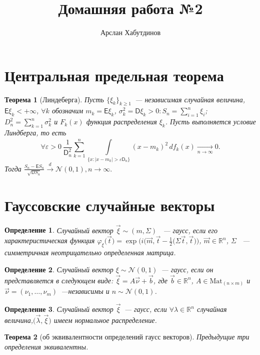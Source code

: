 \documentclass[11pt]{article}
\title{Домашняя работа №2}
\author{Арслан Хабутдинов}
\date{}
\newtheorem{thm}{Теорема}[section]
\newtheorem{dfn}{Определение}
\newcounter{astron}[section]
\begin{document}
\newenvironment{astro}[1]{\textbf{\stepcounter{astron}Задача \theastron. #1 \\}}{}

\maketitle

\section{Центральная предельная теорема}
\begin{thm}[Линдеберга]
Пусть $\{\xi_k\}_{k \geq 1}$~--- независимая случайная величина, $\mathsf{E}\xi_k<+\infty$, $\forall k$ обозначим $m_k = \mathsf{E}\xi_k$, $\sigma_k^2 = \mathsf{D}\xi_k>0:S_n = \sum\limits_{i = 1}^n\xi_i$; $D_n^2=\sum\limits_{k = 1}^n\sigma_k^2$ и $F_k(x)$ функция распределения $\xi_k$. Пусть выполняется условие Линдберга, то есть 
$$
\forall\varepsilon>0~\frac{1}{\mathsf{D}_n^2} \sum\limits_{k=1}^n \int\limits_{\{x:|x - m_k| > \varepsilon \mathsf{D}_n\}}^{} (x - m_k)^2  \,d f_k(x) \xrightarrow[n\rightarrow\infty]{}0.
$$
Тогда $\frac{S_n-\mathsf{E}S_n}{\sqrt{\mathsf{D}S_n}} \xrightarrow{d} \mathcal{N}(0,1), n \rightarrow \infty.$
\end{thm}
\section{Гауссовские случайные векторы}
\begin{dfn}
Случайный вектор $\vec \xi \sim (m,\Sigma)$ ~--- гаусс, если его характеристическая функция $\varphi_\xi\biggl(\vec t\biggr) = \exp{\biggl(i\biggl(\vec m, \vec t} - \frac{1}{2}\biggl(\Sigma \vec t, \vec t\biggr)\biggr)$, 
$\vec m \in \mathbb{R}^n$,
$\Sigma$ ~--- симметричная неотрицательно определенная  матрица.
\end{dfn}
\begin{dfn}
Случайный вектор $\xi \sim \mathcal{N}(0,1)$~--- гаусс, если он представляется в следующем виде: $\vec \xi = A\vec \nu + \vec b$, где  $\vec b \in \mathbb{R}^n$, $A \in \text{Mat}_{(n \times m)}$ и $\vec \nu = (\nu_1, \dots, \nu_m)$~---независимы и $n \sim \mathcal{N}(0,1)$.
\end{dfn}
\begin{dfn}
Случайный вектор $\vec \xi$~--- гаусс, если  $\forall \lambda \in \mathbb{R}^n$ случайная величина,$\biggl(\vec\lambda, \vec\xi\biggr)$ имеем нормальное распределение.
\end{dfn}
\begin{thm}[об эквивалентности определений гаусс векторов]
Предыдущие три определения эквивалентны.
\end{thm}
\end{document}
